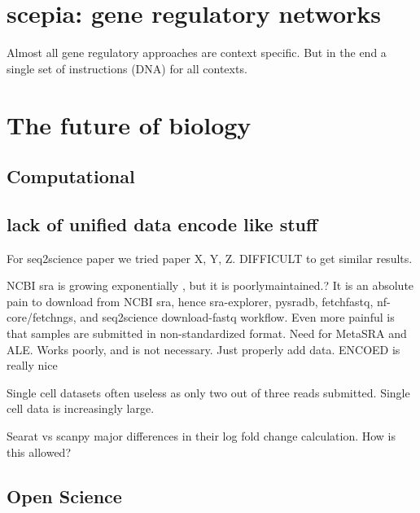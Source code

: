 \section{scepia: gene regulatory networks}

Almost all gene regulatory approaches are context specific. But in the end a single set of instructions (DNA) for all contexts.


\section{The future of biology}

\subsection{Computational}

\subsection{lack of unified data encode like stuff}

For seq2science paper we tried paper X, Y, Z. DIFFICULT to get similar results.     

% 

NCBI sra is growing exponentially \cite{srawebsite}, but it is poorlymaintained.? It is an absolute pain to download from NCBI sra, hence sra-explorer, pysradb, fetchfastq, nf-core/fetchngs, and seq2science download-fastq workflow. Even more painful is that samples are submitted in non-standardized format. Need for MetaSRA and ALE. Works poorly, and is not necessary. Just properly add data. ENCOED is really nice

Single cell datasets often useless as only two out of three reads submitted. Single cell data is increasingly large.

Searat vs scanpy major differences in their log fold change calculation. How is this allowed?

\subsection{Open Science}



